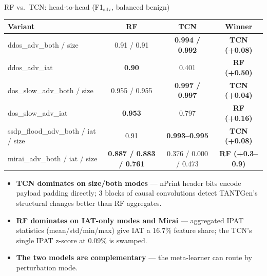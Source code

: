 \documentclass[10pt,aspectratio=169]{beamer}
\newcommand{\good}[1]{\textcolor{good}{\textbf{#1}}}
\begin{document}
\begin{frame}{RF vs.\ TCN: head-to-head (F1$_\text{adv}$, balanced benign)}
\centering\small
\begin{tabular}{lccc}
\toprule
\textbf{Variant} & \textbf{RF} & \textbf{TCN} & \textbf{Winner} \\
\midrule
ddos\_adv\_both / size   & 0.91 / 0.91 & \good{0.994 / 0.992} & \good{TCN (+0.08)} \\
ddos\_adv\_iat           & \good{0.90} & 0.401 & \good{RF (+0.50)} \\
dos\_slow\_adv\_both / size & 0.955 / 0.955 & \good{0.997 / 0.997} & \good{TCN (+0.04)} \\
dos\_slow\_adv\_iat      & \good{0.953} & 0.797 & \good{RF (+0.16)} \\
ssdp\_flood\_adv\_both / iat / size & 0.91 & \good{0.993--0.995} & \good{TCN (+0.08)} \\
mirai\_adv\_both / iat / size & \good{0.887 / 0.883 / 0.761} & 0.376 / 0.000 / 0.473 & \good{RF (+0.3--0.9)} \\
\bottomrule
\end{tabular}

\vspace{0.5em}
\begin{itemize}\small
  \item \good{TCN dominates on size/both modes} --- nPrint header bits encode
        payload padding directly; 3 blocks of causal convolutions detect
        TANTGen's structural changes better than RF aggregates.
  \item \good{RF dominates on IAT-only modes and Mirai} --- aggregated
        IPAT statistics (mean/std/min/max) give IAT a 16.7\% feature share;
        the TCN's single IPAT z-score at 0.09\% is swamped.
  \item \textbf{The two models are complementary} --- the meta-learner
        can route by perturbation mode.
\end{itemize}
\end{frame}
\end{document}
